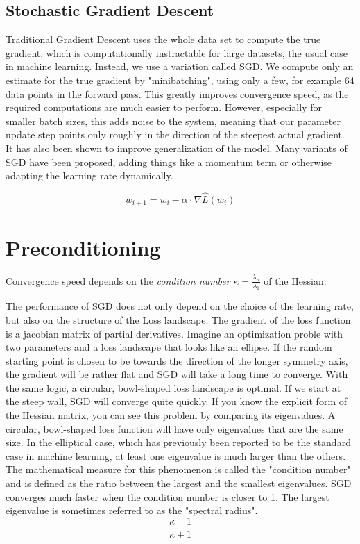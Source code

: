 \documentclass[twoside,12pt,a4paper]{report}
\newcommand{\done}[2][]{\todo[color=green!40, #1]{\textbf{Done:} #2}}
\begin{document}
\subsection{Stochastic Gradient Descent}
Traditional Gradient Descent uses the whole data set to compute the true gradient, which is computationally instractable for large datasets, the usual case in machine learning. Instead, we use a variation called SGD. We compute only an estimate for the true gradient by "minibatching", using only a few, for example 64 data points in the forward pass. This greatly improves convergence speed, as the required computations are much easier to perform. However, especially for smaller batch sizes, this adds noise to the system, meaning that our parameter update step points only roughly in the direction of the steepest actual gradient. It has also been shown to improve generalization of the model.
Many variants of SGD have been proposed, adding things like a momentum term or otherwise adapting the learning rate dynamically.
\done{formula: Noisy update rule}

$$w_{i+1} = w_i - \alpha \cdot \nabla \hat{L}(w_i) $$


\section{Preconditioning}
Convergence speed depends on the \textit{condition number} $\kappa = \frac{\lambda_n}{\lambda_1}$ of the Hessian.


The performance of SGD does not only depend on the choice of the learning rate, but also on the structure of the Loss landscape. The gradient of the loss function is a jacobian matrix of partial derivatives. Imagine an optimization proble with two parameters and a loss landscape that looks like an ellipse. If the random starting point is chosen to be towards the direction of the longer symmetry axis, the gradient will be rather flat and SGD will take a long time to converge. With the same logic, a circular, bowl-shaped loss landscape is optimal.
If we start at the steep wall, SGD will converge quite quickly. If you know the explicit form of the Hessian matrix, you can see this problem by comparing its eigenvalues. A circular, bowl-shaped loss function will have only eigenvalues that are the same size. In the elliptical case, which has previously been reported to be the standard case in machine learning, at least one eigenvalue is much larger than the others.
The mathematical measure for this phenomenon is called the "condition number" and is defined as the ratio between the largest and the smallest eigenvalues. SGD converges much faster when the condition number is closer to 1. The largest eigenvalue is sometimes referred to as the "spectral radius".
$$ \frac{\kappa - 1}{\kappa + 1}$$
\end{document}
